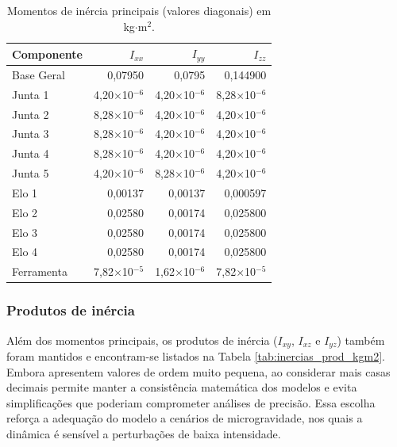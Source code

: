 \begin{table}[H]
\centering
\caption{Momentos de inércia principais (valores diagonais) em kg$\cdot$m$^{2}$.}
\label{tab:inercias_diag_kgm2}
\begin{tabular}{l rrr}
\hline
\textbf{Componente} & $I_{xx}$ & $I_{yy}$ & $I_{zz}$ \\
\hline
Base Geral   & 0,07950   & 0,0795   & 0,144900 \\
Junta 1      & 4,20$\times$10$^{-6}$ & 4,20$\times$10$^{-6}$ & 8,28$\times$10$^{-6}$ \\
Junta 2      & 8,28$\times$10$^{-6}$ & 4,20$\times$10$^{-6}$ & 4,20$\times$10$^{-6}$ \\
Junta 3      & 8,28$\times$10$^{-6}$ & 4,20$\times$10$^{-6}$ & 4,20$\times$10$^{-6}$ \\
Junta 4      & 8,28$\times$10$^{-6}$ & 4,20$\times$10$^{-6}$ & 4,20$\times$10$^{-6}$ \\
Junta 5      & 4,20$\times$10$^{-6}$ & 8,28$\times$10$^{-6}$ & 4,20$\times$10$^{-6}$ \\
Elo 1        & 0,00137  & 0,00137  & 0,000597 \\
Elo 2        & 0,02580   & 0,00174  & 0,025800 \\
Elo 3        & 0,02580   & 0,00174  & 0,025800 \\
Elo 4        & 0,02580   & 0,00174  & 0,025800 \\
Ferramenta   & 7,82$\times$10$^{-5}$ & 1,62$\times$10$^{-6}$ & 7,82$\times$10$^{-5}$ \\
\hline
\end{tabular}
\end{table}



\subsubsection{Produtos de inércia}
Além dos momentos principais, os produtos de inércia ($I_{xy}$, $I_{xz}$ e $I_{yz}$) também foram mantidos e encontram-se listados na Tabela
\eqref{tab:inercias_prod_kgm2}. 
Embora apresentem valores de ordem muito pequena, ao considerar mais casas decimais permite manter a consistência matemática dos modelos e evita simplificações que poderiam comprometer análises de precisão. 
Essa escolha reforça a adequação do modelo a cenários de microgravidade, nos quais a dinâmica é sensível a perturbações de baixa intensidade.



